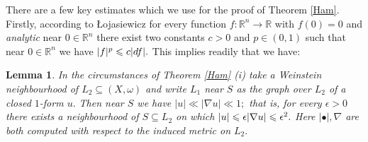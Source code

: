 \documentclass{article}
\theoremstyle{plain}%
\newtheorem{lem}[thm]{Lemma}
\theoremstyle{definition}
\numberwithin{equation}{section}
\numberwithin{figure}{section}
\def\l{\label}
\def\le{\leqslant\nobreak}
\def\R{{\mathbin{\mathbb R}}}
\def\ep{\epsilon}
\def\om{\omega}
\def\bl{\bullet}
\def\nb{\nabla}
\def\sb{\subseteq}
\begin{document}

There are a few key estimates which we use for the proof of Theorem \ref{Ham}.
Firstly, according to \L{}ojasiewicz \cite{Lj}
for every function $f:\R^n\to\R$ with $f(0)=0$ and {\it analytic} near $0\in\R^n$
there exist two constants $c>0$ and $p\in(0,1)$ such that near $0\in\R^n$
we have $|f|^p\le c|df|.$
This implies readily that we have:
\begin{lem}\l{Loj}
In the circumstances of Theorem \ref{Ham} {\rm(i)}
take a Weinstein neighbourhood of $L_2\sb(X,\om)$ and write $L_1$ near $S$ as the graph over $L_2$ of a closed $1$-form $u.$
Then near $S$ we have
$|u|\ll |\nb u|\ll1;$
that is, for every $\ep>0$ there exists a neighbourhood of $S\sb L_2$ on which $|u|\le \ep|\nb u|\le\ep^2.$
Here $|\bl|,\nb$ are both computed with respect to the induced metric on $L_2.$
\end{lem}
\end{document}
